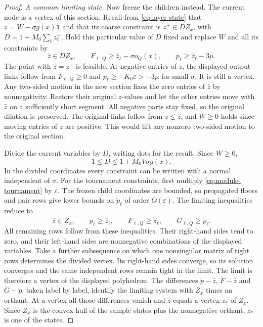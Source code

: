 \begin{proof}
\smallskip
\noindent\emph{A common limiting state.}
Now freeze the children instead. The current node is a vertex of this
section. Recall from \eqref{eq:layer-state} that $z=W-\sigma g(x)\mathbf 1$
and that its coarse constraint is $z^+\in D Z_x$, with
$D=1+M_0\sum_\ell z_\ell^-$. Hold this particular value of $D$ fixed
and replace $W$ and all its constraints by
\[
  \widehat z\in D Z_x,\qquad
  F_{\ell,Q}\ge\widehat z_\ell-\sigma o_Q(x),\qquad
  p_\ell\ge\widehat z_\ell-3\mu .
\]
The point with $\widehat z=z^+$ is feasible. At negative entries of
$z$, the displayed output links follow from $F_{\ell,Q}\ge0$ and
$p_\ell\ge-K_0\varepsilon>-3\mu$ for small $\sigma$.
It is still a vertex. Any two-sided motion in the new section fixes
the zero entries of $\widehat z$ by nonnegativity. Restore their
original $z$-values and let the other entries move with $\widehat z$
on a sufficiently short segment. All negative parts stay fixed, so the
original dilation is preserved. The original links follow from
$z\le\widehat z$, and $W\ge0$ holds since moving entries of $z$
are positive. This would lift any nonzero two-sided motion to the
original section.

Divide the current variables by \(D\), writing dots for the
result. Since \(W\ge0\),
\[
        1\le D\le 1+M_0V\sigma g(x).
\]
In the divided coordinates every constraint can be written with a
normal independent of \(\sigma\). For the tournament constraints,
first multiply \eqref{eq:module-tournament} by \(\varepsilon\).
The frozen child coordinates are bounded, so propagated floors and
pair rows give lower bounds on \(\dot p_\ell\) of order
\(O(\varepsilon)\). The limiting inequalities reduce to
\[
 \dot{\widehat z}\in Z_x,\qquad
 \dot p_\ell\ge\dot{\widehat z}_\ell,\qquad
 \dot F_{\ell,Q}\ge\dot{\widehat z}_\ell,\qquad
 \dot G_{\ell,Q}\ge\dot p_\ell .
\]
All remaining rows follow from these inequalities. Their right-hand
sides tend to zero, and their left-hand sides are nonnegative
combinations of the displayed variables. Take a further subsequence
on which one nonsingular matrix of tight rows determines the divided
vertex. Its right-hand sides converge, so its solution converges and
the same independent rows remain tight in the limit. The limit is
therefore a vertex of the displayed polyhedron. The differences
$\dot p-\dot{\widehat z}$, $\dot F-\dot{\widehat z}$ and $\dot G-\dot p$,
taken label by label, identify the limiting system
with $Z_x$ times an orthant. At a vertex all those differences vanish and
$\dot{\widehat z}$ equals a vertex $z_*$ of $Z_x$. Since $Z_x$ is
the convex hull of the sample states plus the nonnegative orthant,
$z_*$ is one of the states.


\end{proof}
